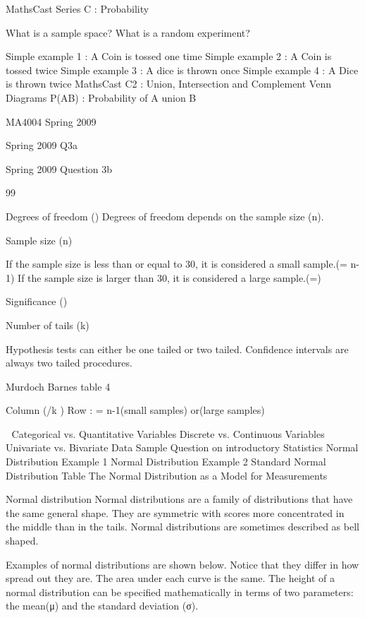 MathsCast Series C : Probability

What is a sample space?
What is a random experiment?
 
Simple example 1 : A Coin is tossed one time
Simple example 2 : A Coin is tossed twice
Simple example 3 : A dice is thrown once
Simple example 4 : A Dice is thrown twice  
MathsCast C2 : Union, Intersection and Complement
Venn Diagrams
P(AB)  : Probability of A union B


MA4004 Spring 2009

Spring 2009 Q3a


Spring 2009 Question 3b

99%


Degrees of freedom ()
Degrees of freedom depends on the sample size (n).

Sample size (n)

If the sample size is less than or equal to 30, it is considered a small sample.(= n-1)
If the sample size is larger than 30, it is considered a large sample.(=)

Significance ()

Number of tails (k)

Hypothesis tests can either be one tailed or two tailed.
Confidence intervals are always two tailed procedures.


Murdoch Barnes table 4

Column (/k )
Row : = n-1(small samples) or(large samples)



Categorical vs. Quantitative Variables
Discrete vs. Continuous Variables
Univariate vs. Bivariate Data
Sample Question on introductory Statistics
Normal Distribution Example 1
Normal Distribution Example 2
Standard Normal Distribution Table
The Normal Distribution as a Model for Measurements

Normal distribution
Normal distributions are a family of distributions that have the same general shape. They are symmetric with scores more concentrated in the middle than in the tails. Normal distributions are sometimes described as bell shaped. 

Examples of normal distributions are shown below. Notice that they differ in how spread out they are. The area under each curve is the same. The height of a normal distribution can be specified mathematically in terms of two parameters: the mean(μ) and the standard deviation (σ). 

 

